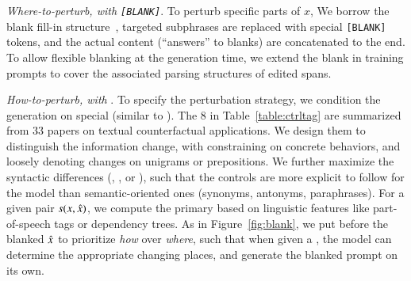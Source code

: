 \emph{Where-to-perturb, with \texttt{[BLANK]}}.
To perturb specific parts of $x$, We borrow the blank fill-in structure~\cite{donahue2020enabling}, \ie targeted subphrases are replaced with special \texttt{[BLANK]} tokens, and the actual content (``answers'' to blanks) are concatenated to the end. 
To allow flexible blanking at the generation time, we extend the blank in training prompts to cover the associated parsing structures of edited spans.

\emph{How-to-perturb, with \tagstrs}.
To specify the perturbation strategy, we condition the generation on special \tagstrs (similar to \citet{raffel2019exploring, Dathathri2020Plug}).
The 8 \tagstrs in Table~\ref{table:ctrltag} are summarized from 33 papers on textual counterfactual applications.
We design them to distinguish the information change, with \eg {} constraining on concrete behaviors, and  loosely denoting changes on unigrams or prepositions.
We further maximize the syntactic differences (\eg {}, , or ), such that the controls are more explicit to follow for the model than semantic-oriented ones (synonyms, antonyms, paraphrases).
For a given pair $s(x, \hat{x})$, we compute the primary \tagstrshort based on linguistic features like part-of-speech tags or dependency trees.
As in Figure~\ref{fig:blank}, we put \tagstrs before the blanked $\hat{x}$ to prioritize \emph{how} over \emph{where}, such that when given a \tagstr, the model can determine the appropriate changing places, and generate the blanked prompt on its own. 


